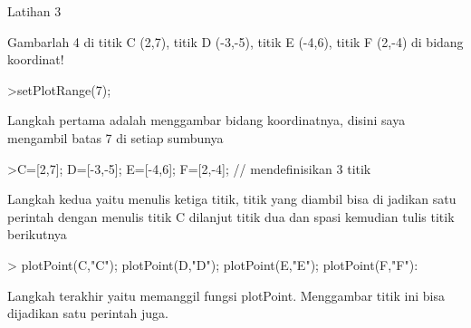 \documentclass[a4paper,10pt]{article}
\begin{document}
\begin{eulernotebook}
\begin{eulercomment}
\begin{eulercomment}
\begin{eulercomment}
Latihan 3\\
\end{eulercomment}
\eulersubheading{}
\begin{eulercomment}
Gambarlah 4 di titik C (2,7), titik D (-3,-5), titik E (-4,6), titik F
(2,-4) di bidang koordinat!
\end{eulercomment}
\begin{eulerprompt}
>setPlotRange(7);
\end{eulerprompt}
\begin{eulercomment}
Langkah pertama adalah menggambar bidang koordinatnya, disini saya
mengambil batas 7 di setiap sumbunya
\end{eulercomment}
\begin{eulerprompt}
>C=[2,7]; D=[-3,-5]; E=[-4,6]; F=[2,-4]; // mendefinisikan 3 titik
\end{eulerprompt}
\begin{eulercomment}
Langkah kedua yaitu menulis ketiga titik, titik yang diambil bisa di
jadikan satu perintah dengan menulis titik C dilanjut titik dua dan
spasi kemudian tulis titik berikutnya
\end{eulercomment}
\begin{eulerprompt}
> plotPoint(C,"C"); plotPoint(D,"D"); plotPoint(E,"E"); plotPoint(F,"F"):
\end{eulerprompt}
\begin{eulercomment}
Langkah terakhir yaitu memanggil fungsi plotPoint. Menggambar titik
ini bisa dijadikan satu perintah juga.


\end{eulercomment}
\end{eulercomment}
\end{eulercomment}
\end{eulernotebook}
\end{document}
